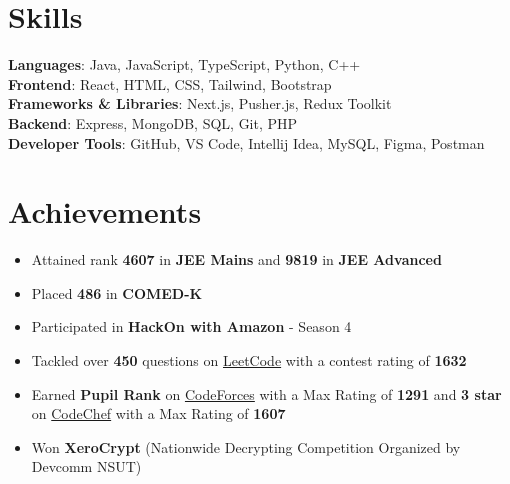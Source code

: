 \documentclass[letterpaper,11pt]{article}
\newcommand{\resumeItem}[1]{
  \item\small{
    {#1 \vspace{-4pt}}
  }
}
\newcommand{\resumeSubItem}[1]{\resumeItem{#1}\vspace{-4.5pt}}
\newcommand{\resumeSubItemListStart}{\begin{itemize}[leftmargin=0.25in]}
\newcommand{\resumeSubItemListEnd}{\end{itemize}\vspace{-6pt}}
\begin{document}
\section{Skills}
 \begin{itemize}[leftmargin=0.15in, label={}]
    \small{\item{
     \textbf{Languages}{: Java, JavaScript, TypeScript, Python, C++} \\
    \textbf{Frontend}{: React, HTML, CSS, Tailwind, Bootstrap} \\
     \textbf{Frameworks \& Libraries}{: Next.js, Pusher.js,  Redux Toolkit} \\
    \textbf{Backend}{: Express, MongoDB, SQL, Git, PHP} \\
     \textbf{Developer Tools}{: GitHub, VS Code, Intellij Idea, MySQL, Figma, Postman} \\
    }}
 \end{itemize}

\section{Achievements}
    \resumeSubItemListStart
    \resumeSubItem{Attained rank \textbf{4607} in \textbf{JEE Mains} and  \textbf{9819} in \textbf{JEE Advanced}}
    \resumeSubItem{Placed \textbf{486} in \textbf{COMED-K}}
    \resumeSubItem{Participated in \textbf{HackOn with Amazon} - Season 4}
    \resumeSubItem{Tackled over \textbf{450} questions on {\href{https://leetcode.com/u/jaiswarup/} {LeetCode} with a contest rating of \textbf{1632}}}
    \resumeSubItem{Earned \textbf{Pupil Rank} on {\href{https://codeforces.com/profile/JaiSwarup} {CodeForces}} with a Max Rating of \textbf{1291} and \textbf{3 star} on {\href{https://www.codechef.com/users/jswarup} {CodeChef} with a Max Rating of \textbf{1607}}}
    \resumeSubItem{Won \textbf{XeroCrypt} (Nationwide Decrypting Competition Organized by Devcomm NSUT)}
    \resumeSubItemListEnd

\end{document}
